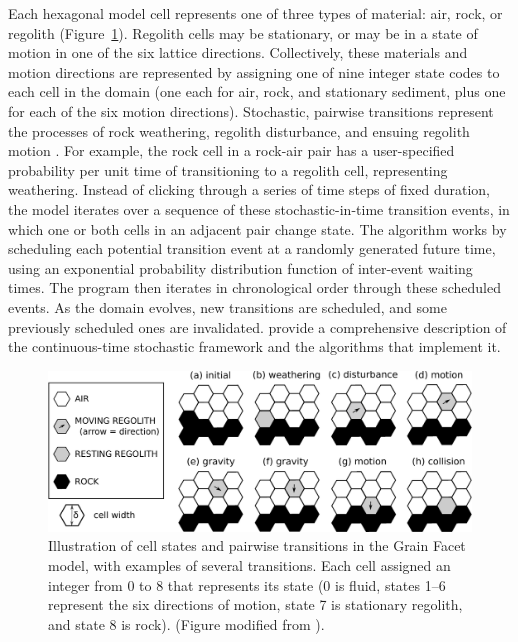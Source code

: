 Each hexagonal model cell represents one of three types of material: air, rock, or regolith (Figure~\ref{fig:cellstates}). Regolith cells may be stationary, or may be in a state of motion in one of the six lattice directions. Collectively, these materials and motion directions are represented by assigning one of nine integer state codes to each cell in the domain (one each for air, rock, and stationary sediment, plus one for each of the six motion directions). Stochastic, pairwise transitions represent the processes of rock weathering, regolith disturbance, and ensuing regolith motion \citep{tucker2016celllab,tucker2018lattice}. For example, the rock cell in a rock-air pair has a user-specified probability per unit time of transitioning to a regolith cell, representing weathering. Instead of clicking through a series of time steps of fixed duration, the model iterates over a sequence of these stochastic-in-time transition events, in which one or both cells in an adjacent pair change state. The algorithm works by scheduling each potential transition event at a randomly generated future time, using an exponential probability distribution function of inter-event waiting times. The program then iterates in chronological order through these scheduled events. As the domain evolves, new transitions are scheduled, and some previously scheduled ones are invalidated. \citet{tucker2016celllab} provide a comprehensive description of the continuous-time stochastic framework and the algorithms that implement it.

\begin{figure}[ht!]
\centerline{\includegraphics[scale=0.7]{Figures/cell_states_and_transitions.pdf}}
\caption{Illustration of cell states and pairwise transitions in the Grain Facet model, with examples of several transitions. Each cell assigned an integer from 0 to 8 that represents its state (0 is fluid, states 1--6 represent the six directions of motion, state 7 is stationary regolith, and state 8 is rock). (Figure modified from \citet{tucker2018lattice}).}
\label{fig:cellstates}
\end{figure}

